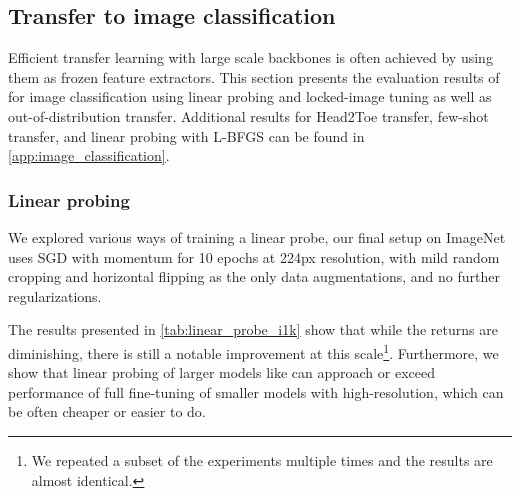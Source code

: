 \subsection{Transfer to image classification}
Efficient transfer learning with large scale backbones is often achieved by using them as frozen feature extractors. This section presents the evaluation results of \chonk for image classification using linear probing and locked-image tuning as well as out-of-distribution transfer. Additional results for  Head2Toe transfer, few-shot transfer, and linear probing with L-BFGS can be found in \cref{app:image_classification}.

\subsubsection{Linear probing}


We explored various ways of training a linear probe, %
our final setup on ImageNet uses SGD with momentum for 10 epochs at 224px resolution, with mild random cropping and horizontal flipping as the only data augmentations, and no further regularizations.


The results presented in \cref{tab:linear_probe_i1k} show that while the returns are diminishing, there is still a notable improvement at this scale\footnote{We repeated a subset of the experiments multiple times and the results are almost identical.}.
Furthermore, we show that linear probing of larger models like \chonk can approach or exceed performance of full fine-tuning of smaller models with high-resolution, which can be often cheaper or easier to do.


